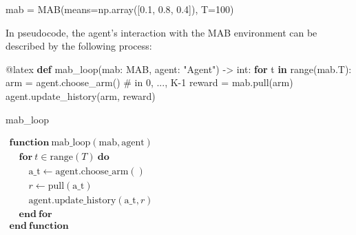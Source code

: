 \documentclass[
  letterpaper,
  DIV=11,
  numbers=noendperiod]{scrreprt}
\newenvironment{Shaded}{\begin{snugshade}}{\end{snugshade}}
\newcommand{\AttributeTok}[1]{\textcolor[rgb]{0.40,0.45,0.13}{#1}}
\newcommand{\BuiltInTok}[1]{\textcolor[rgb]{0.00,0.23,0.31}{#1}}
\newcommand{\CommentTok}[1]{\textcolor[rgb]{0.37,0.37,0.37}{#1}}
\newcommand{\ControlFlowTok}[1]{\textcolor[rgb]{0.00,0.23,0.31}{\textbf{#1}}}
\newcommand{\DecValTok}[1]{\textcolor[rgb]{0.68,0.00,0.00}{#1}}
\newcommand{\FloatTok}[1]{\textcolor[rgb]{0.68,0.00,0.00}{#1}}
\newcommand{\KeywordTok}[1]{\textcolor[rgb]{0.00,0.23,0.31}{\textbf{#1}}}
\newcommand{\NormalTok}[1]{\textcolor[rgb]{0.00,0.23,0.31}{#1}}
\newcommand{\OperatorTok}[1]{\textcolor[rgb]{0.37,0.37,0.37}{#1}}
\newcommand{\StringTok}[1]{\textcolor[rgb]{0.13,0.47,0.30}{#1}}
\theoremstyle{plain}
\theoremstyle{plain}
\theoremstyle{definition}
\theoremstyle{definition}
\theoremstyle{remark}
\begin{document}
\begin{Shaded}
\begin{Highlighting}[]
\NormalTok{mab }\OperatorTok{=}\NormalTok{ MAB(means}\OperatorTok{=}\NormalTok{np.array([}\FloatTok{0.1}\NormalTok{, }\FloatTok{0.8}\NormalTok{, }\FloatTok{0.4}\NormalTok{]), T}\OperatorTok{=}\DecValTok{100}\NormalTok{)}
\end{Highlighting}
\end{Shaded}

In pseudocode, the agent's interaction with the MAB environment can be
described by the following process:

\begin{Shaded}
\begin{Highlighting}[]
\AttributeTok{@latex}
\KeywordTok{def}\NormalTok{ mab\_loop(mab: MAB, agent: }\StringTok{"Agent"}\NormalTok{) }\OperatorTok{{-}\textgreater{}} \BuiltInTok{int}\NormalTok{:}
    \ControlFlowTok{for}\NormalTok{ t }\KeywordTok{in} \BuiltInTok{range}\NormalTok{(mab.T):}
\NormalTok{        arm }\OperatorTok{=}\NormalTok{ agent.choose\_arm()  }\CommentTok{\# in 0, ..., K{-}1}
\NormalTok{        reward }\OperatorTok{=}\NormalTok{ mab.pull(arm)}
\NormalTok{        agent.update\_history(arm, reward)}


\NormalTok{mab\_loop}
\end{Highlighting}
\end{Shaded}

$ \begin{array}{l} \mathbf{function} \ \mathrm{mab\_loop}(\mathrm{mab}, \mathrm{agent}) \\ \hspace{1em} \mathbf{for} \ t \in \mathrm{range} \mathopen{}\left( T \mathclose{}\right) \ \mathbf{do} \\ \hspace{2em} \mathrm{a\_t} \gets \mathrm{agent}.\mathrm{choose\_arm} \mathopen{}\left( \mathclose{}\right) \\ \hspace{2em} r \gets \mathrm{pull} \mathopen{}\left( \mathrm{a\_t} \mathclose{}\right) \\ \hspace{2em} \mathrm{agent}.\mathrm{update\_history} \mathopen{}\left( \mathrm{a\_t}, r \mathclose{}\right) \\ \hspace{1em} \mathbf{end \ for} \\ \mathbf{end \ function} \end{array} $
\end{document}
